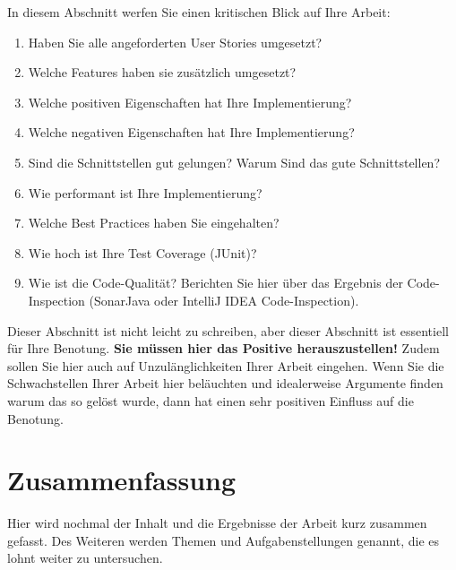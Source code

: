 \documentclass[fleqn,10pt,ngerman]{SelfArx}
\begin{document}
	In diesem Abschnitt werfen Sie einen kritischen Blick auf Ihre Arbeit:
	\begin{enumerate}
		\item Haben Sie alle angeforderten User Stories umgesetzt? 
		\item Welche Features haben sie zus\"atzlich umgesetzt?
		\item Welche positiven Eigenschaften hat Ihre Implementierung?
		\item Welche negativen Eigenschaften hat Ihre Implementierung? 		
		\item Sind die Schnittstellen gut gelungen? Warum Sind das gute Schnittstellen? 
		\item Wie performant ist Ihre Implementierung?
		\item Welche Best Practices haben Sie eingehalten? 
		\item Wie hoch ist Ihre Test Coverage (JUnit)? 
		\item Wie ist die Code-Qualität? Berichten Sie hier über das Ergebnis der Code-Inspection (SonarJava oder IntelliJ IDEA Code-Inspection). 
	\end{enumerate}
	
	Dieser Abschnitt ist nicht leicht zu schreiben, aber dieser Abschnitt ist essentiell für Ihre Benotung. \textbf{Sie müssen hier das Positive herauszustellen!} Zudem sollen Sie hier auch auf Unzul\"anglichkeiten Ihrer Arbeit eingehen. Wenn Sie die Schwachstellen Ihrer Arbeit hier bel\"auchten und idealerweise Argumente finden warum das so gelöst wurde, dann hat einen sehr positiven Einfluss auf die Benotung. 
	
	
	
	\section{Zusammenfassung}
	Hier wird nochmal der Inhalt und die Ergebnisse der Arbeit kurz zusammen gefasst. Des Weiteren werden Themen und Aufgabenstellungen genannt, die es lohnt weiter zu untersuchen.
	
	
	
	
	
	
\end{document}
